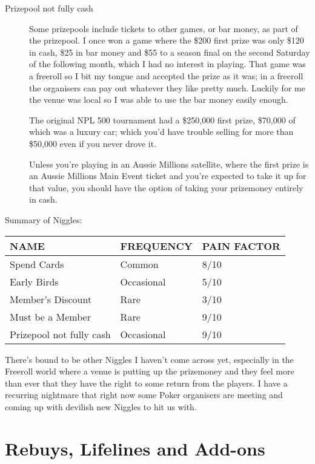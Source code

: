 \begin{description}
\item[Prizepool not fully cash] Some prizepools include tickets
to other games, or bar money, as part of the prizepool. I once won a game
where the \$200 first prize was only \$120 in cash, \$25 in bar money
and \$55 to a season final on the second Saturday of the following month,
which I had no interest in playing. That game was a freeroll so I bit
my tongue and accepted the prize as it was; in a freeroll the organisers
can pay out whatever they like pretty much. Luckily for me the venue
was local so I was able to use the bar money easily enough.

The original NPL 500 tournament had a \$250,000 first prize, \$70,000 of
which was a luxury car; which you'd have trouble selling for more
than \$50,000 even if you never drove it.

Unless you're playing in an Aussie Millions satellite, where the first prize
is an Aussie Millions Main Event ticket and you're expected to take it
up for that value, you should have the option of taking your prizemoney
entirely in cash.


\end{description}

Summary of Niggles:

\begin{tabular}{|l|l|l|} \hline
NAME    &  FREQUENCY  & PAIN FACTOR\\ \hline
Spend Cards & Common  & 8/10\\ \hline
Early Birds & Occasional & 5/10\\ \hline
Member's Discount & Rare  & 3/10\\ \hline
Must be a Member & Rare  & 9/10\\ \hline
Prizepool not fully cash & Occasional & 9/10\\ \hline
\end{tabular}

There's bound to be other Niggles I haven't come across yet,
especially in the Freeroll world where a venue is putting up the
prizemoney and they feel more than ever that they have the right
to some return from the players. I have a recurring
nightmare that right now some Poker organisers are meeting and
coming up with devilish new Niggles to hit us with.

\section{Rebuys, Lifelines and Add-ons}

